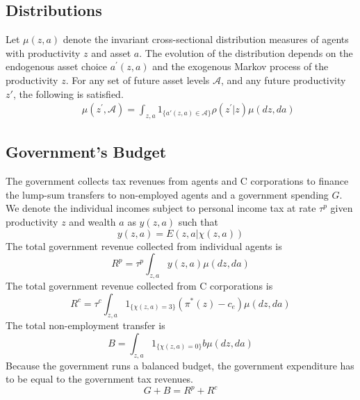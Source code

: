\documentclass[12pt]{article}
\begin{document}
\subsection{Distributions}

Let $\mu(z,a)$ denote the invariant cross-sectional distribution measures of
agents with productivity $z$ and asset $a$. The evolution of the distribution depends on the endogenous asset choice $a^{\prime}(z,a)$ and the exogenous Markov process of the productivity $z$. For any set of future asset levels $\mathcal{A}$, and any future productivity $z'$, the following is satisfied.
\begin{eqnarray*}
&&\mu(z^{\prime},\mathcal{A})= \int_{z,a}
1_{\{a'(z,a)\in \mathcal{A}\}} \rho(z^{\prime}|z)  \mu(dz,da)
\end{eqnarray*}

\subsection{Government's Budget}

The government collects tax revenues from agents and C corporations to finance the lump-sum transfers to non-employed agents and a government spending $G$. 
We denote the individual incomes subject to personal income tax at rate $\tau^p$ given productivity $z$ and wealth $a$ as $y(z,a)$ such that
\begin{equation}
y(z,a)=E(z,a|\chi(z,a))
\end{equation}
The total government revenue collected
from individual agents is 
\begin{equation*}
R^p=\tau^p \int_{z,a} y(z,a)\mu(dz,da)
\end{equation*}
The total government revenue collected from C corporations is 
\begin{equation*}
R^c=\tau^c\int_{z,a} 1_{\{\chi(z,a)=3\}}(\pi^*(z)-c_e) \mu(dz, da)
\end{equation*}
The total non-employment transfer is 
\begin{equation*}
B=\int_{z,a} 1_{\{\chi(z,a)=0\}} b\mu(dz, da)
\end{equation*}
Because the government runs a balanced budget, the government expenditure has to be equal to the government tax revenues. 
\begin{equation}
G+B=R^p +R^c \label{eqn:govbudget}
\end{equation}
\end{document}
